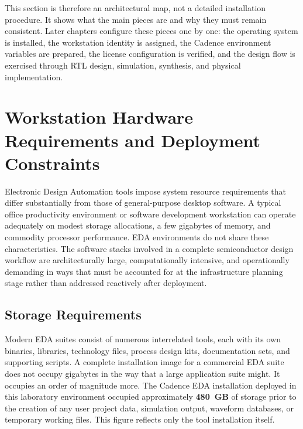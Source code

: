 This section is therefore an architectural map, not a detailed installation procedure. It shows
what the main pieces are and why they must remain consistent. Later chapters configure these
pieces one by one: the operating system is installed, the workstation identity is assigned, the
Cadence environment variables are prepared, the license configuration is verified, and the design
flow is exercised through RTL design, simulation, synthesis, and physical implementation.\\

\section{Workstation Hardware Requirements and Deployment Constraints}

Electronic Design Automation tools impose system resource requirements that differ substantially
from those of general-purpose desktop software. A typical office productivity environment or
software development workstation can operate adequately on modest storage allocations, a few
gigabytes of memory, and commodity processor performance. EDA environments do not share these
characteristics. The software stacks involved in a complete semiconductor design workflow are
architecturally large, computationally intensive, and operationally demanding in ways that must
be accounted for at the infrastructure planning stage rather than addressed reactively after
deployment. 

\subsection{Storage Requirements}

Modern EDA suites consist of numerous interrelated tools, each with its own binaries, libraries,
technology files, process design kits, documentation sets, and supporting scripts. A complete
installation image for a commercial EDA suite does not occupy gigabytes in the way that a large
application suite might. It occupies an order of magnitude more. The Cadence EDA installation
deployed in this laboratory environment occupied approximately \textbf{480~GB} of storage prior
to the creation of any user project data, simulation output, waveform databases, or temporary
working files. This figure reflects only the tool installation itself.\\

